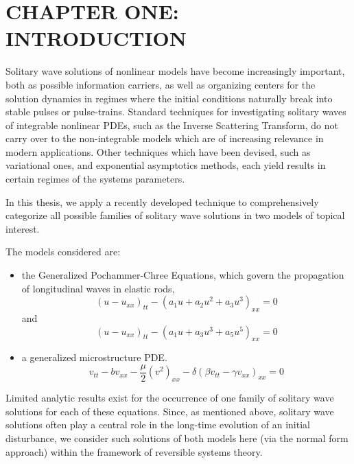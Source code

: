 \chapter{CHAPTER ONE: INTRODUCTION} \label{chapter_1}

Solitary wave solutions of nonlinear models have become increasingly
important, both as possible information carriers,
as well as organizing centers for the solution dynamics in regimes
where the initial conditions naturally break into stable pulses or
pulse-trains. Standard techniques for investigating solitary waves of
integrable nonlinear PDEs,
such as the Inverse Scattering Transform, do not carry over to the
non-integrable models which are of increasing relevance in modern
applications. Other techniques which have been devised, such as
variational ones, and exponential asymptotics methods, each yield
results in certain regimes of the systems parameters.

In this thesis, we apply a recently developed technique to
comprehensively categorize all possible families of solitary wave
solutions in two models of topical interest.

The models considered are:
\begin{itemize}
\item the Generalized Pochammer-Chree Equations, which  govern the
propagation of longitudinal waves in elastic rods,
\begin{equation}\label{eq:GPC1}
\left( u - u_{xx} \right)_{tt} - \left( a_1 u + a_2 u^2 + a_3 u^3 \right)_{xx} =0  
\end{equation}
and
\begin{equation}  \label{eq:GPC2} 
\left( u - u_{xx} \right)_{tt} - \left( a_1 u + a_3 u^3 + a_5 u^5 \right)_{xx} =0
\end{equation}

\item a generalized microstructure PDE.
\begin{equation}\label{eq:MS}
v_{tt} - b v_{xx} - \frac{\mu}{2} \left( v^2 \right)_{xx} - \delta \left( \beta v_{tt} - \gamma v_{xx}\right)_{xx} = 0 
\end{equation}
\end{itemize}

Limited analytic results exist for the occurrence of one family
of  solitary wave solutions for each of these equations. Since, as
mentioned above, solitary wave solutions often play a central role in
the long-time evolution of an initial disturbance, we consider
such solutions of both models here (via the normal form approach)
within the framework of reversible systems theory.

